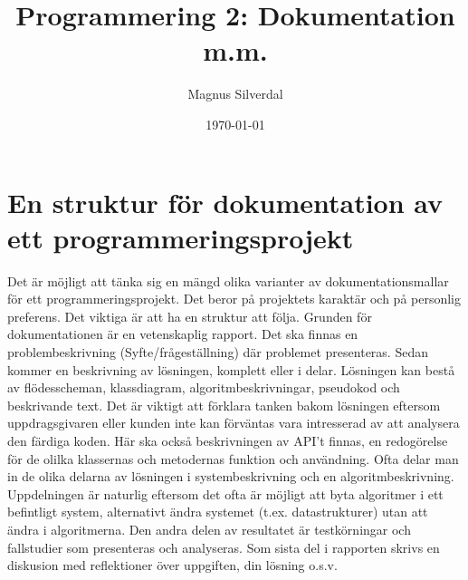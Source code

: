 \documentclass[11pt,a4paper]{article}
\begin{document}
    \title{Programmering 2: Dokumentation m.m.}
    \author{Magnus Silverdal}
    \date{\today}
    \maketitle




    \section{En struktur för dokumentation av ett programmeringsprojekt}
    Det är möjligt att tänka sig en mängd olika varianter av dokumentationsmallar för ett programmeringsprojekt. Det
    beror på projektets karaktär och på personlig preferens. Det viktiga är att ha en struktur att följa. Grunden för
    dokumentationen är en vetenskaplig rapport. Det ska finnas en problembeskrivning (Syfte/frågeställning) där problemet
    presenteras. Sedan kommer en beskrivning av lösningen, komplett eller i delar. Lösningen kan bestå av flödesscheman,
    klassdiagram, algoritmbeskrivningar, pseudokod och beskrivande text. Det är viktigt att förklara tanken bakom lösningen
    eftersom uppdragsgivaren eller kunden inte kan förväntas vara intresserad av att analysera den färdiga koden. Här ska
    också beskrivningen av API't finnas, en redogörelse för de olilka klassernas och metodernas funktion och användning.
    Ofta delar man in de olika delarna av lösningen i systembeskrivning och en algoritmbeskrivning. Uppdelningen är naturlig
    eftersom det ofta är möjligt att byta algoritmer i ett befintligt system, alternativt ändra systemet (t.ex. datastrukturer)
    utan att ändra i algoritmerna. Den andra delen av resultatet är testkörningar och fallstudier som presenteras och analyseras.
    Som sista del i rapporten skrivs en diskusion med reflektioner över uppgiften, din lösning o.s.v.
\end{document}
